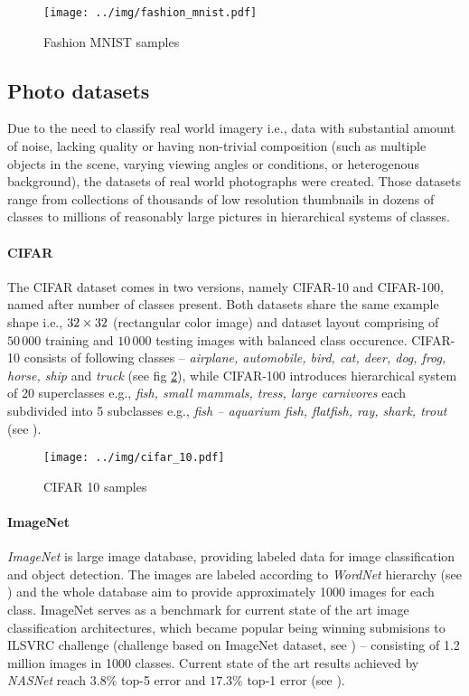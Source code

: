 \begin{figure}
    \centering
    \texttt{[image: ../img/fashion\_mnist.pdf]}
    \caption{Fashion MNIST samples}
    \label{fig:fashion_mnist}
\end{figure}

\subsection{Photo datasets}
Due to the need to classify real world imagery i.e., data with substantial amount of noise, lacking quality or having non-trivial composition (such as multiple objects in the scene, varying viewing angles or conditions, or heterogenous background), the datasets of real world photographs were created. Those datasets range from collections of thousands of low resolution thumbnails in dozens of classes to millions of reasonably large pictures in hierarchical systems of classes.

\paragraph{CIFAR}

The CIFAR dataset comes in two versions, namely CIFAR-10 and CIFAR-100, named after number of classes present. Both datasets share the same example shape i.e., $32 \times 32 \time 3$ (rectangular color image) and dataset layout comprising of $50\,000$ training and $10\,000$ testing images with balanced class occurence. CIFAR-10 consists of following classes -- \emph{airplane, automobile, bird, cat, deer, dog, frog, horse, ship} and \emph{truck} (see fig \ref{fig:cifar_10}), while CIFAR-100 introduces hierarchical system of 20 superclasses e.g., \emph{fish, small mammals, tress, large carnivores} each subdivided into 5 subclasses e.g., \emph{fish -- aquarium fish, flatfish, ray, shark, trout} (see \cite{Krizhevsky09learningmultiple}).

\begin{figure}
    \centering
    \texttt{[image: ../img/cifar\_10.pdf]}
    \caption{CIFAR 10 samples}
    \label{fig:cifar_10}
\end{figure}

\paragraph{ImageNet}

\emph{ImageNet} is large image database, providing labeled data for image classification and object detection. The images are labeled according to \emph{WordNet\textsuperscript{\textregistered}} hierarchy (see \cite{wordnet}) and the whole database aim to provide approximately 1000 images for each class. ImageNet serves as a benchmark for current state of the art image classification architectures, which became popular being winning submisions to ILSVRC challenge (challenge based on ImageNet dataset, see \cite{ILSVRC15}) -- consisting of 1.2 million images in 1000 classes. Current state of the art results achieved by \emph{NASNet} reach $3.8\%$ top-5 error and $17.3\%$ top-1 error (see \cite{nasnet}).

